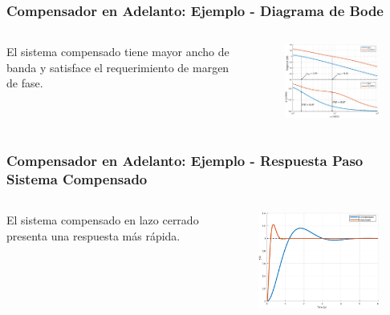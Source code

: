 \documentclass[aspectratio=169]{beamer}
\theoremstyle{definition}
\theoremstyle{plain}
\theoremstyle{remark}
\begin{document}
\begin{frame}[<+->]\frametitle{Compensador en Adelanto: Ejemplo - Diagrama de Bode}
\begin{columns}
	\begin{column}{0.3\textwidth}
		El sistema compensado tiene mayor ancho de banda y satisface el requerimiento de margen de fase.
	\end{column}
	\begin{column}{0.7\textwidth}
		\begin{figure}
			\centering
			\includegraphics[width=9cm]{images/bodeLeadCompExampleComparison.eps}
		\end{figure}
	\end{column}
\end{columns}
\end{frame}

\begin{frame}[<+->]\frametitle{Compensador en Adelanto: Ejemplo - Respuesta Paso Sistema Compensado}
\begin{columns}
	\begin{column}{0.3\textwidth}
		El sistema compensado en lazo cerrado presenta una respuesta más rápida.
	\end{column}
	\begin{column}{0.7\textwidth}
		\begin{figure}
			\centering
			\includegraphics[width=9cm]{images/bodeLeadCompExampleStep.eps}
		\end{figure}
	\end{column}
\end{columns}
\end{frame}
\end{document}
